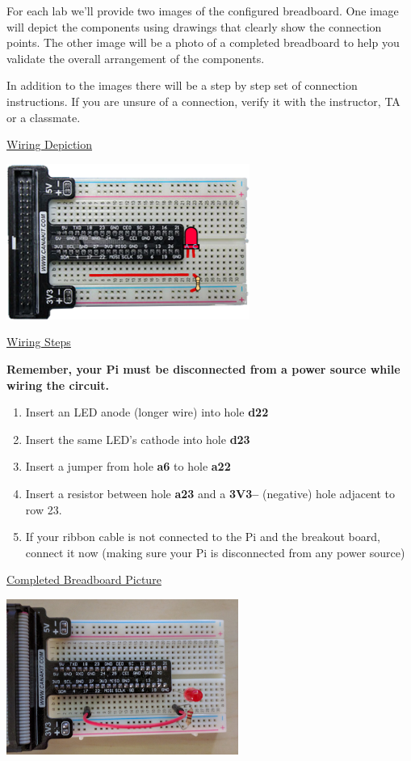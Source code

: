 \hfill

For each lab we'll provide two images of the configured breadboard. One image will depict the components using drawings that clearly show the connection points. The other image will be a photo of a completed breadboard to help you validate the overall arrangement of the components.

In addition to the images there will be a step by step set of connection instructions. If you are unsure of a connection, verify it with the instructor, TA or a classmate.

\pagebreak

\underline{Wiring Depiction}

\beforefig
\centerline{\includegraphics[height=2in]{pi_images/lab01images/PiLab01-1Light.png}}
\afterfig

\underline{Wiring Steps}

\textbf{Remember, your Pi must be disconnected from a power source while wiring the circuit.}

\begin{enumerate}
	\item Insert an LED anode (longer wire) into hole \textbf{d22}
	\item Insert the same LED's cathode into hole \textbf{d23}
	
	\item Insert a jumper from hole \textbf{a6} to hole \textbf{a22}
	
	\item Insert a resistor between hole \textbf{a23} and a \textbf{3V3--} (negative) hole adjacent to row 23.
	
	\item If your ribbon cable is not connected to the Pi and the breakout board, connect it now (making sure your Pi is disconnected from any power source)
\end{enumerate}

\underline{Completed Breadboard Picture}

\beforefig
\centerline{\includegraphics[height=2in]{pi_images/lab01images/PiLab01-1Light-photo.jpg}}
\afterfig


